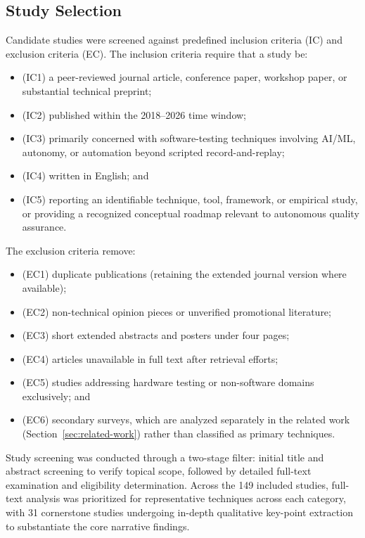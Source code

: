 \subsection{Study Selection}
\label{subsec:study-selection}
Candidate studies were screened against predefined inclusion criteria (IC) and
exclusion criteria (EC).
The inclusion criteria require that a study be:
\begin{itemize}
  \item (IC1) a peer-reviewed journal article, conference paper, workshop paper, or substantial technical preprint;
  \item (IC2) published within the 2018--2026 time window;
  \item (IC3) primarily concerned with software-testing techniques involving AI/ML, autonomy, or automation beyond scripted record-and-replay;
  \item (IC4) written in English; and
  \item (IC5) reporting an identifiable technique, tool, framework, or empirical study, or providing a recognized conceptual roadmap relevant to autonomous quality assurance.
\end{itemize}
The exclusion criteria remove:
\begin{itemize}
  \item (EC1) duplicate publications (retaining the extended journal version where available);
  \item (EC2) non-technical opinion pieces or unverified promotional literature;
  \item (EC3) short extended abstracts and posters under four pages;
  \item (EC4) articles unavailable in full text after retrieval efforts;
  \item (EC5) studies addressing hardware testing or non-software domains exclusively; and
  \item (EC6) secondary surveys, which are analyzed separately in the related work (Section~\ref{sec:related-work}) rather than classified as primary techniques.
\end{itemize}

Study screening was conducted through a two-stage filter: initial title and abstract
screening to verify topical scope, followed by detailed full-text examination and eligibility
determination. Across the 149 included studies, full-text analysis was prioritized for
representative techniques across each category, with 31 cornerstone studies undergoing
in-depth qualitative key-point extraction to substantiate the core narrative findings.

